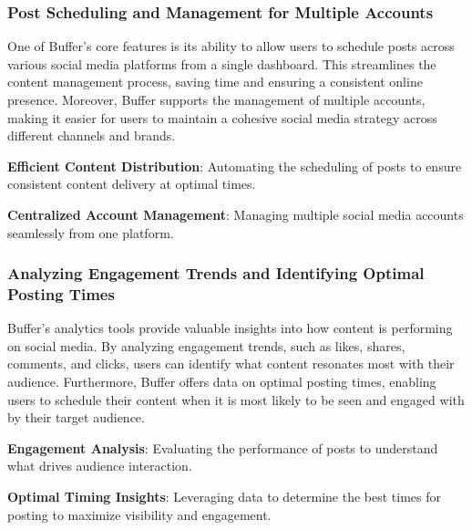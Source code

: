 \documentclass[
]{book}
\begin{document}
\hypertarget{post-scheduling-and-management-for-multiple-accounts}{%
\subsubsection*{Post Scheduling and Management for Multiple Accounts}\label{post-scheduling-and-management-for-multiple-accounts}}

One of Buffer's core features is its ability to allow users to schedule posts across various social media platforms from a single dashboard. This streamlines the content management process, saving time and ensuring a consistent online presence. Moreover, Buffer supports the management of multiple accounts, making it easier for users to maintain a cohesive social media strategy across different channels and brands.

\textbf{Efficient Content Distribution}: Automating the scheduling of posts to ensure consistent content delivery at optimal times.

\textbf{Centralized Account Management}: Managing multiple social media accounts seamlessly from one platform.

\hypertarget{analyzing-engagement-trends-and-identifying-optimal-posting-times}{%
\subsubsection*{Analyzing Engagement Trends and Identifying Optimal Posting Times}\label{analyzing-engagement-trends-and-identifying-optimal-posting-times}}

Buffer's analytics tools provide valuable insights into how content is performing on social media. By analyzing engagement trends, such as likes, shares, comments, and clicks, users can identify what content resonates most with their audience. Furthermore, Buffer offers data on optimal posting times, enabling users to schedule their content when it is most likely to be seen and engaged with by their target audience.

\textbf{Engagement Analysis}: Evaluating the performance of posts to understand what drives audience interaction.

\textbf{Optimal Timing Insights}: Leveraging data to determine the best times for posting to maximize visibility and engagement.
\end{document}
